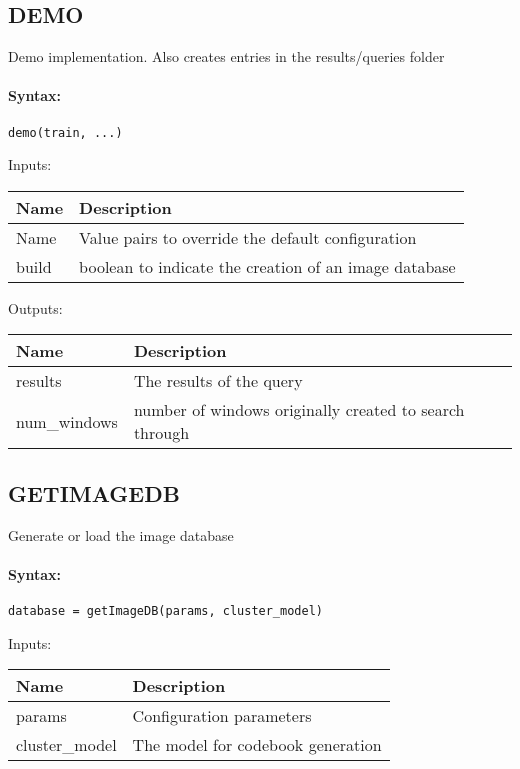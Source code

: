 
\subsection{DEMO}

Demo implementation. Also creates entries in the results/queries folder

\paragraph{Syntax:} \verb|demo(train, ...)|

\bigskip
Inputs:

\begin{tabular}{|p{}|p{}|}
\hline
\textbf{Name} & \textbf{Description} \\
\hline \hline
Name & Value pairs to override the default configuration  \\ \hline
build & boolean to indicate the creation of an image database  \\ \hline
\end{tabular}

\bigskip
Outputs:

\begin{tabular}{|p{}|p{}|}
\hline
\textbf{Name} & \textbf{Description} \\
\hline \hline
results & The results of the query  \\ \hline
num\_windows & number of windows originally created to search through  \\ \hline
\end{tabular}

\subsection{GETIMAGEDB}

Generate or load the image database

\paragraph{Syntax:} \verb|database = getImageDB(params, cluster_model)|

\bigskip
Inputs:

\begin{tabular}{|p{}|p{}|}
\hline
\textbf{Name} & \textbf{Description} \\
\hline \hline
params & Configuration parameters  \\ \hline
cluster\_model & The model for codebook generation  \\ \hline
\end{tabular}

